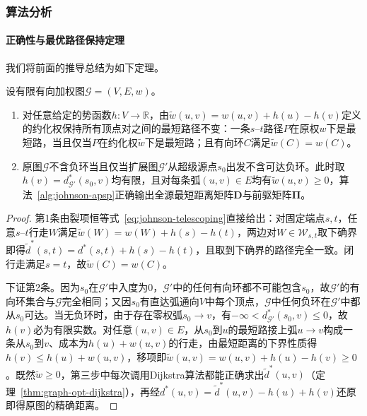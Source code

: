 \subsubsection{算法分析}

\paragraph{正确性与最优路径保持定理}
我们将前面的推导总结为如下定理。

\begin{theorem}[Johnson重赋权的非负性与最优路径保持]
\label{thm:johnson-correctness}
设有限有向加权图$\mathcal G=(V,E,w)$。
\begin{enumerate}
  \item 对任意给定的势函数$h:V\to\mathbb R$，由$\tilde w(u,v)=w(u,v)+h(u)-h(v)$定义的约化权保持所有顶点对之间的最短路径不变：一条$s$--$t$路径$P$在原权$w$下是最短路，当且仅当$P$在约化权$\tilde w$下是最短路；且有向环$C$满足$\tilde w(C)=w(C)$。
  \item 原图$\mathcal G$不含负环当且仅当扩展图$\mathcal G'$从超级源点$s_0$出发不含可达负环。此时取$h(v)=d^*_{\mathcal G'}(s_0,v)$均有限，且对每条弧$(u,v)\in E$均有$\tilde w(u,v)\geq0$，算法~\ref{alg:johnson-apsp}正确输出全源最短距离矩阵$\bm D$与前驱矩阵$\bm\Pi$。
\end{enumerate}
\end{theorem}

\begin{proof}
第1条由裂项恒等式~\eqref{eq:johnson-telescoping}直接给出：对固定端点$s,t$，任意$s$--$t$行走$W$满足$\tilde w(W)=w(W)+h(s)-h(t)$，两边对$W\in\mathcal W_{s,t}$取下确界即得$\tilde d^*(s,t)=d^*(s,t)+h(s)-h(t)$，且取到下确界的路径完全一致。闭行走满足$s=t$，故$\tilde w(C)=w(C)$。

下证第2条。因为$s_0$在$\mathcal G'$中入度为$0$，$\mathcal G'$中的任何有向环都不可能包含$s_0$，故$\mathcal G'$的有向环集合与$\mathcal G$完全相同；又因$s_0$有直达弧通向$V$中每个顶点，$\mathcal G$中任何负环在$\mathcal G'$中都从$s_0$可达。当无负环时，由于存在零权弧$s_0\to v$，有$-\infty<d^*_{\mathcal G'}(s_0,v)\leq0$，故$h(v)$必为有限实数。对任意$(u,v)\in E$，从$s_0$到$u$的最短路接上弧$u\to v$构成一条从$s_0$到$v$、成本为$h(u)+w(u,v)$的行走，由最短距离的下界性质得$h(v)\leq h(u)+w(u,v)$，移项即$\tilde w(u,v)=w(u,v)+h(u)-h(v)\geq0$。既然$\tilde w\geq0$，第三步中每次调用Dijkstra算法都能正确求出$\tilde d^*(u,v)$（定理~\ref{thm:graph-opt-dijkstra}），再经$d^*(u,v)=\tilde d^*(u,v)-h(u)+h(v)$还原即得原图的精确距离。
\end{proof}

